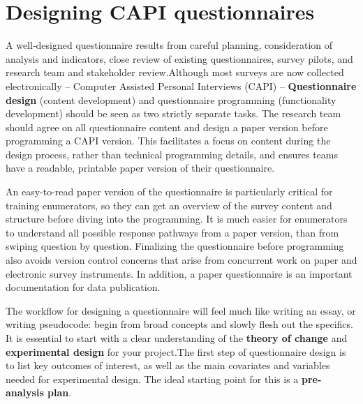 
\begin{fullwidth}
	

\end{fullwidth}


\section{Designing CAPI questionnaires}
A well-designed questionnaire results from careful planning, consideration of analysis and indicators, close review of existing questionnaires, survey pilots, and research team and stakeholder review.Although most surveys are now collected electronically -- Computer Assisted Personal Interviews (CAPI) -- 
\textbf{Questionnaire design}
(content development) and questionnaire programming (functionality development) should be seen as two strictly separate tasks. The research team should agree on all questionnaire content and design a paper version before programming a CAPI version. This facilitates a focus on content during the design process, rather than technical programming details, and ensures teams have a readable, printable paper version of their questionnaire. 

An easy-to-read paper version of the questionnaire is particularly critical for training enumerators, so they can get an overview of the survey content and structure before diving into the programming. It is much easier for enumerators to understand all possible response pathways from a paper version, than from swiping question by question. Finalizing the questionnaire before programming also avoids version control concerns that arise from concurrent work on paper and electronic survey instruments. In addition, a paper questionnaire is an important documentation for data publication. 

The workflow for designing a questionnaire will feel much like writing an essay, or writing pseudocode: begin from broad concepts and slowly flesh out the specifics. It is essential to start with a clear understanding of the 
\textbf{theory of change} 
and \textbf{experimental design} for your project.The first step of questionnaire design is to list key outcomes of interest, as well as the main covariates and variables needed for experimental design. The ideal starting point for this is a 
\textbf{pre-analysis plan}. 

